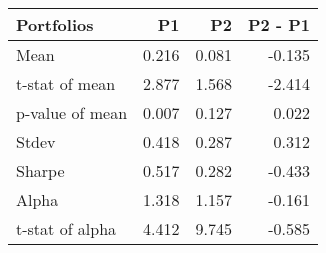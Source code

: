 \begin{tabular}{lrrr}
\toprule
Portfolios & P1 & P2 & P2 - P1 \\
\midrule
Mean & 0.216 & 0.081 & -0.135 \\
t-stat of mean & 2.877 & 1.568 & -2.414 \\
p-value of mean & 0.007 & 0.127 & 0.022 \\
Stdev & 0.418 & 0.287 & 0.312 \\
Sharpe & 0.517 & 0.282 & -0.433 \\
Alpha & 1.318 & 1.157 & -0.161 \\
t-stat of alpha & 4.412 & 9.745 & -0.585 \\
\bottomrule
\end{tabular}
